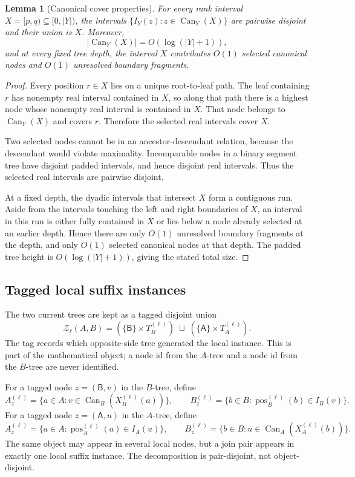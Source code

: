 \documentclass[11pt]{article}
\newcommand{\Can}{\operatorname{Can}}
\newcommand{\pos}{\operatorname{pos}}
\newcommand{\Znodes}{\mathcal Z}
\newcommand{\sideA}{\ensuremath{\mathsf A}}
\newcommand{\sideB}{\ensuremath{\mathsf B}}
\newtheorem{lemma}[theorem]{Lemma}
\theoremstyle{definition}
\begin{document}
\begin{lemma}[Canonical cover properties]
\label{lem:canonical-cover}
For every rank interval $X=[p,q)\subseteq[0,|Y|)$, the intervals $\{I_Y(z):z\in\Can_Y(X)\}$ are pairwise disjoint and their union is $X$.  Moreover,
\[
  |\Can_Y(X)|=O(\log(|Y|+1)),
\]
and at every fixed tree depth, the interval $X$ contributes $O(1)$ selected canonical nodes and $O(1)$ unresolved boundary fragments.
\end{lemma}

\begin{proof}
Every position $r\in X$ lies on a unique root-to-leaf path.  The leaf containing $r$ has nonempty real interval contained in $X$, so along that path there is a highest node whose nonempty real interval is contained in $X$.  That node belongs to $\Can_Y(X)$ and covers $r$.  Therefore the selected real intervals cover $X$.

Two selected nodes cannot be in an ancestor-descendant relation, because the descendant would violate maximality.  Incomparable nodes in a binary segment tree have disjoint padded intervals, and hence disjoint real intervals.  Thus the selected real intervals are pairwise disjoint.

At a fixed depth, the dyadic intervals that intersect $X$ form a contiguous run.  Aside from the intervals touching the left and right boundaries of $X$, an interval in this run is either fully contained in $X$ or lies below a node already selected at an earlier depth.  Hence there are only $O(1)$ unresolved boundary fragments at the depth, and only $O(1)$ selected canonical nodes at that depth.  The padded tree height is $O(\log(|Y|+1))$, giving the stated total size.
\end{proof}

\subsection{Tagged local suffix instances}

The two current trees are kept as a tagged disjoint union
\[
  \Znodes_\ell(A,B)=
  (\{\sideB\}\times T_B^{(\ell)})
  \;\sqcup\;
  (\{\sideA\}\times T_A^{(\ell)}).
\]
The tag records which opposite-side tree generated the local instance.  This is part of the mathematical object; a node id from the $A$-tree and a node id from the $B$-tree are never identified.

For a tagged node $z=(\sideB,v)$ in the $B$-tree, define
\[
  A_z^{(\ell)}=
  \{a\in A:v\in\Can_B(X_B^{(\ell)}(a))\},
  \qquad
  B_z^{(\ell)}=
  \{b\in B:\pos_B^{(\ell)}(b)\in I_B(v)\}.
\]
For a tagged node $z=(\sideA,u)$ in the $A$-tree, define
\[
  A_z^{(\ell)}=
  \{a\in A:\pos_A^{(\ell)}(a)\in I_A(u)\},
  \qquad
  B_z^{(\ell)}=
  \{b\in B:u\in\Can_A(X_A^{(\ell)}(b))\}.
\]
The same object may appear in several local nodes, but a join pair appears in exactly one local suffix instance.  The decomposition is pair-disjoint, not object-disjoint.
\end{document}
